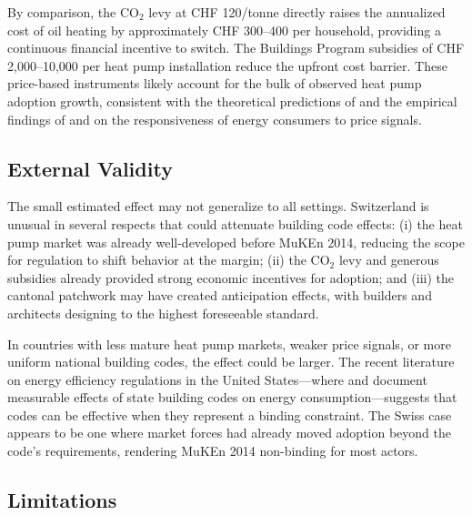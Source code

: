 \documentclass[12pt]{article}
\begin{document}
By comparison, the CO$_2$ levy at CHF 120/tonne directly raises the annualized cost of oil heating by approximately CHF 300--400 per household, providing a continuous financial incentive to switch. The Buildings Program subsidies of CHF 2,000--10,000 per heat pump installation reduce the upfront cost barrier. These price-based instruments likely account for the bulk of observed heat pump adoption growth, consistent with the theoretical predictions of \citet{gillingham2012energy} and the empirical findings of \citet{ito2014moral} and \citet{jessoe2014knowledge} on the responsiveness of energy consumers to price signals.

\subsection{External Validity}

The small estimated effect may not generalize to all settings. Switzerland is unusual in several respects that could attenuate building code effects: (i) the heat pump market was already well-developed before MuKEn 2014, reducing the scope for regulation to shift behavior at the margin; (ii) the CO$_2$ levy and generous subsidies already provided strong economic incentives for adoption; and (iii) the cantonal patchwork may have created anticipation effects, with builders and architects designing to the highest foreseeable standard.

In countries with less mature heat pump markets, weaker price signals, or more uniform national building codes, the effect could be larger. The recent literature on energy efficiency regulations in the United States---where \citet{levinson2016energy} and \citet{jacobsen2016untapped} document measurable effects of state building codes on energy consumption---suggests that codes can be effective when they represent a binding constraint. The Swiss case appears to be one where market forces had already moved adoption beyond the code's requirements, rendering MuKEn 2014 non-binding for most actors.

\subsection{Limitations}
\end{document}
